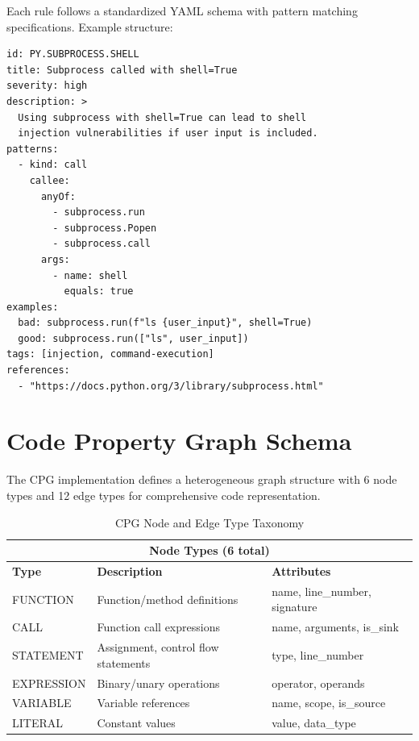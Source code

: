 Each rule follows a standardized YAML schema with pattern matching specifications. Example structure:

\begin{small}
\begin{verbatim}
id: PY.SUBPROCESS.SHELL
title: Subprocess called with shell=True
severity: high
description: >
  Using subprocess with shell=True can lead to shell
  injection vulnerabilities if user input is included.
patterns:
  - kind: call
    callee:
      anyOf:
        - subprocess.run
        - subprocess.Popen
        - subprocess.call
      args:
        - name: shell
          equals: true
examples:
  bad: subprocess.run(f"ls {user_input}", shell=True)
  good: subprocess.run(["ls", user_input])
tags: [injection, command-execution]
references:
  - "https://docs.python.org/3/library/subprocess.html"
\end{verbatim}
\end{small}

\section{Code Property Graph Schema}

The CPG implementation defines a heterogeneous graph structure with 6 node types and 12 edge types for comprehensive code representation.

\begin{table}[H]
\centering
\caption{CPG Node and Edge Type Taxonomy}
\label{tab:cpg-schema}
\footnotesize
\begin{tabular}{|l|p{6cm}|l|}
\hline
\multicolumn{3}{|c|}{\textbf{Node Types (6 total)}} \\
\hline
\textbf{Type} & \textbf{Description} & \textbf{Attributes} \\
\hline
FUNCTION & Function/method definitions & name, line\_number, signature \\
\hline
CALL & Function call expressions & name, arguments, is\_sink \\
\hline
STATEMENT & Assignment, control flow statements & type, line\_number \\
\hline
EXPRESSION & Binary/unary operations & operator, operands \\
\hline
VARIABLE & Variable references & name, scope, is\_source \\
\hline
LITERAL & Constant values & value, data\_type \\
\hline
\end{tabular}
\end{table}

